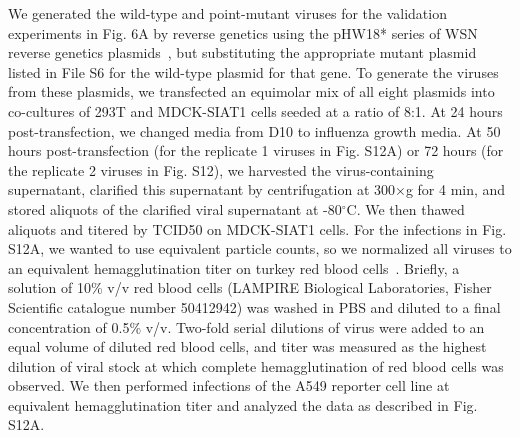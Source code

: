 \documentclass[]{article}
\begin{document}
We generated the wild-type and point-mutant viruses for the validation experiments in Fig. 6A by reverse genetics using the pHW18* series of WSN reverse genetics plasmids~\cite{hoffmann2000dna}, but substituting the appropriate mutant plasmid listed in File S6 for the wild-type plasmid for that gene.
To generate the viruses from these plasmids, we transfected an equimolar mix of all eight plasmids into co-cultures of 293T and MDCK-SIAT1 cells seeded at a ratio of 8:1.
At 24 hours post-transfection, we changed media from D10 to influenza growth media. 
At 50 hours post-transfection (for the replicate 1 viruses in Fig. S12A) or 72 hours (for the replicate 2 viruses in Fig. S12), we harvested the virus-containing supernatant, clarified this supernatant by centrifugation at 300$\times$g for 4 min, and stored aliquots of the clarified viral supernatant at -80$^{\circ}$C.
We then thawed aliquots and titered by TCID50 on MDCK-SIAT1 cells.
For the infections in Fig. S12A, we wanted to use equivalent particle counts, so we normalized all viruses to an equivalent hemagglutination titer on turkey red blood cells~\cite{hirst1942quantitative}.
 Briefly, a solution of 10\% v/v red blood cells (LAMPIRE Biological Laboratories, Fisher Scientific catalogue number 50412942)  was washed in PBS and diluted to a final concentration of 0.5\% v/v. 
Two-fold serial dilutions of virus were added to an equal volume of diluted red blood cells, and titer was measured as the highest dilution of viral stock at which complete hemagglutination of red blood cells was observed.
We then performed infections of the A549 reporter cell line at equivalent hemagglutination titer and analyzed the data as described in Fig. S12A. 
\end{document}
